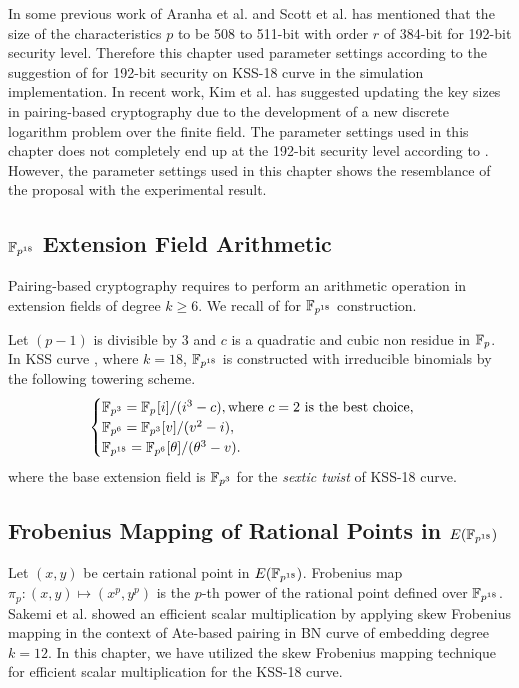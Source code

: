 In some previous work of  Aranha et al. \cite{PAIRING:AFKMR12} and Scott et al. \cite{IMA:Scott11} has mentioned that the size of the characteristics $p$ to be 508 to 511-bit with order $r$ of 384-bit  for 192-bit security level.  
Therefore this chapter used parameter settings according to the suggestion of \cite{PAIRING:AFKMR12} for 192-bit security on KSS-18 curve in the simulation implementation. In recent work, Kim et al. \cite{C:KimBar16} has suggested updating the key sizes in pairing-based cryptography due to the development of a new discrete logarithm problem over the finite field. The parameter settings used in this chapter does not completely end up at the 192-bit security level according to \cite{C:KimBar16}. However, the parameter settings used in this chapter shows the resemblance of the proposal with the experimental result.

\subsection{\texorpdfstring{$\mathbb{F}_{p^{18}}$}{Fp18} Extension Field Arithmetic}
Pairing-based cryptography requires to perform an arithmetic operation in extension fields of degree $k \geq 6$\cite{Silverman}. 
We recall  of  for $\mathbb{F}_{p^{18}}$ construction.

Let $(p-1)$ is divisible by 3 and $c$ is a quadratic and cubic non residue in ${\mathbb{F}}_{p}$. In KSS curve \cite{EPRINT:KacSchSco07}, where $k=18$, $\mathbb{F}_{p^{18}}$ is constructed  with irreducible binomials by the following towering scheme.
\begin{equation}
\begin{cases}
{\mathbb{F}}_{p^{3}} = {\mathbb{F}}_{p^{}}[i]/(i^3-c),  \text{where $c = 2$ is the best choice,}\nonumber \\ 
{\mathbb{F}}_{p^{6}} = {\mathbb{F}}_{p^{3}}[v]/(v^2-i), \nonumber \\ 
{\mathbb{F}}_{p^{18}} = {\mathbb{F}}_{p^{6}}[\theta]/(\theta^3-v). \nonumber \\ 
\end{cases}
\end{equation}\label{eq:KSS18_towering_chapter_g2scm_kss18}
where the base extension field is $\mathbb{F}_{p^3}$ for the \textit{sextic twist} of KSS-18 curve.

\subsection{Frobenius Mapping of Rational Points in  \texorpdfstring{ $E(\mathbb{F}_{p^{18}})$}{E(Fp18)}} 
Let $(x,y)$ be certain rational point in $E(\mathbb{F}_{p^{18}})$. 
Frobenius map $\pi_p : (x,y) \mapsto  (x^p,y^p)$ is the $p$-th power of the rational point defined over $\mathbb{F}_{p^{18}}$. 
Sakemi et al. \cite{CANS:SNOKM08} showed an efficient scalar multiplication by applying skew Frobenius mapping in the context of Ate-based pairing in BN curve of embedding degree $k=12$.  In this chapter, we have utilized the skew Frobenius mapping technique for efficient scalar multiplication for the KSS-18 curve.

